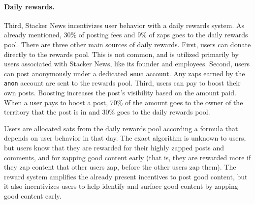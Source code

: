 \paragraph{Daily rewards.} Third, Stacker News incentivizes user behavior with a daily rewards system. As already mentioned, 30\% of posting fees and 9\% of zaps goes to the daily rewards pool. There are three other main sources of daily rewards. First, users can donate directly to the rewards pool. This is not common, and is utilized primarily by users associated with Stacker News, like its founder and employees. Second, users can post anonymously under a dedicated \texttt{anon} account. Any zaps earned by the \texttt{anon} account are sent to the rewards pool. Third, users can pay to boost their own posts. Boosting increases the post's visibility based on the amount paid. When a user pays to boost a post, 70\% of the amount goes to the owner of the territory that the post is in and 30\% goes to the daily rewards pool.

Users are allocated sats from the daily rewards pool according a formula that depends on user behavior in that day. The exact algorithm is unknown to users, but users know that they are rewarded for their highly zapped posts and comments, and for zapping good content early (that is, they are rewarded more if they zap content that other users zap, before the other users zap them). The reward system amplifies the already present incentives to post good content, but it also incentivizes users to help identify and surface good content by zapping good content early.

